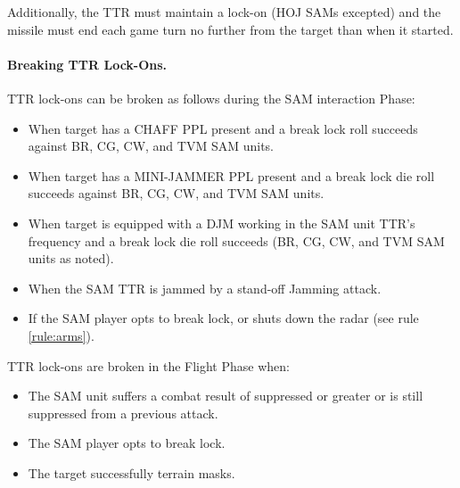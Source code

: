 Additionally, the TTR must maintain a lock-on (HOJ SAMs excepted) and the missile must end each game turn no further from the target than when it started.

\paragraph{Breaking TTR Lock-Ons.} 

TTR lock-ons can be broken as follows during the SAM interaction Phase:

\begin{itemize}
    \item When target has a CHAFF PPL present and a break lock roll succeeds against BR, CG, CW, and TVM SAM units.

    \item When target has a MINI-JAMMER PPL present and a break lock die roll succeeds against BR, CG, CW, and TVM SAM units.

    \item When target is equipped with a DJM working in the SAM unit TTR's frequency and a break lock die roll succeeds (BR, CG, CW, and TVM SAM units as noted). 


    \item When the SAM TTR is jammed by a stand-off Jamming attack.
    
    \item If the SAM player opts to break lock, or shuts down the radar (see rule \ref{rule:arms}).

\end{itemize}



TTR lock-ons are broken in the Flight Phase when:
\begin{itemize}

    \item The SAM unit suffers a combat result of suppressed or greater or is still suppressed from a previous attack.

    \item The SAM player opts to break lock.

    \item The target successfully terrain masks.

\end{itemize}

